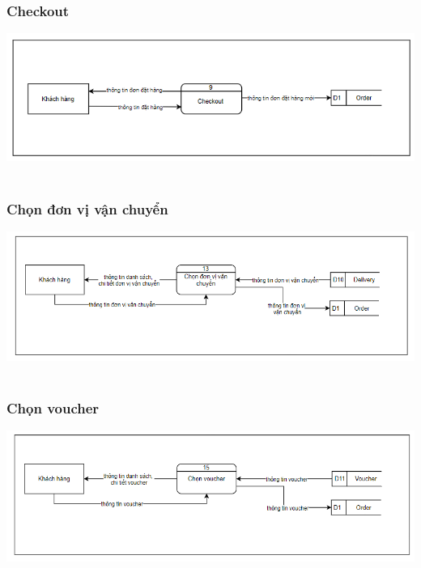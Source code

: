 \documentclass[12pt,a4paper,2sides]{report}
\begin{document}
\subsubsection{Checkout}
    \includegraphics[width=1\linewidth]{lib/DFD/checkout.png}\\\vspace*{1cm}
    \hspace{5cm}{Hình 9. Checkout}\\
\subsubsection{Chọn đơn vị vận chuyển}
    \includegraphics[width=1\linewidth]{lib/DFD/chondvvc.png}\\\vspace*{1cm}
    \hspace{4cm}{Hình 10. Chọn đơn vị vận chuyển}\\
\subsubsection{Chọn voucher}
    \includegraphics[width=1\linewidth]{lib/DFD/chonvoucher.png}\\\vspace*{1cm}
    \hspace{5cm}{Hình 11. Chọn voucher}\\
\end{document}
